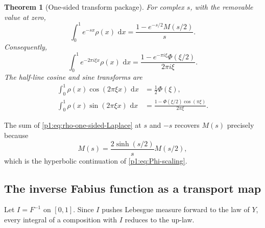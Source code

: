 \documentclass[11pt]{article}
\newtheorem{theorem}{Theorem}[section]
\theoremstyle{definition}
\theoremstyle{remark}
\newcommand{\dd}{\,\mathrm d}
\begin{document}
\begin{theorem}[One-sided transform package]\label{p1:thm:one-sided}
For complex \(s\), with the removable value at zero,
\begin{equation}
 \boxed{
 \int_0^1e^{-sx}\rho(x)\,\dd x
 =\frac{1-e^{-s/2}M(s/2)}{s}.
 }                                                           \label{p1:eq:rho-one-sided-Laplace}
\end{equation}
Consequently,
\begin{equation}
 \boxed{
 \int_0^1e^{-2\pi i\xi x}\rho(x)\,\dd x
 =\frac{1-e^{-\pi i\xi}\Phi(\xi/2)}{2\pi i\xi}.
 }                                                           \label{p1:eq:rho-one-sided-Fourier}
\end{equation}
The half-line cosine and sine transforms are
\begin{align}
 \int_0^1\rho(x)\cos(2\pi\xi x)\,\dd x
 &=\frac12\Phi(\xi),                                        \label{p1:eq:rho-half-cos}\\
 \int_0^1\rho(x)\sin(2\pi\xi x)\,\dd x
 &=\frac{1-\Phi(\xi/2)\cos(\pi\xi)}{2\pi\xi}.             \label{p1:eq:rho-half-sin}
\end{align}
\end{theorem}

The sum of \eqref{p1:eq:rho-one-sided-Laplace} at \(s\) and \(-s\) recovers
\(M(s)\) precisely because
\begin{equation}
 M(s)=\frac{2\sinh(s/2)}{s}M(s/2),                           \label{p1:eq:M-scaling}
\end{equation}
which is the hyperbolic continuation of \eqref{p1:eq:Phi-scaling}.

\subsection{The inverse Fabius function as a transport map}

Let \(I=F^{-1}\) on \([0,1]\).  Since \(I\) pushes Lebesgue measure forward to the law
of \(Y\), every integral of a composition with \(I\) reduces to the up-law.
\end{document}
